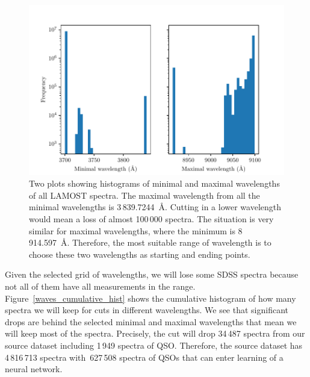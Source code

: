 \begin{figure}
\includegraphics[width=\textwidth]{img/wavemin_wavemax_hist.pdf}
\caption[Minimal and maximal wavelength of LAMOST DR5]{
	Two plots showing histograms of minimal and maximal wavelengths
	of all LAMOST spectra.
	The maximal wavelength from all the minimal wavelengths
	is 3\,839.7244~\AA{}.
	Cutting in a lower wavelength
	would mean a loss of almost 100\,000 spectra.
	The situation is very similar for maximal wavelengths,
	where the minimum is 8\,914.597~\AA{}.
	Therefore, the most suitable range of wavelength is to choose
	these two wavelengths as starting and ending points.
	}
\label{wavemin_wavemax_hist}
\end{figure}

Given the selected grid of wavelengths,
we will lose some SDSS spectra because not all of them have all measurements in the range.
Figure~\ref{waves_cumulative_hist} shows the cumulative histogram of how many spectra we will keep for cuts in different wavelengths.
We see that significant drops are behind the selected minimal and maximal wavelengths
that mean we will keep most of the spectra.
Precisely, the cut will drop 34\,487 spectra from our source dataset
including 1\,949 spectra of QSO.
Therefore, the source dataset has 4\,816\,713 spectra with~627\,508 spectra of QSOs that can enter learning of a neural network.

